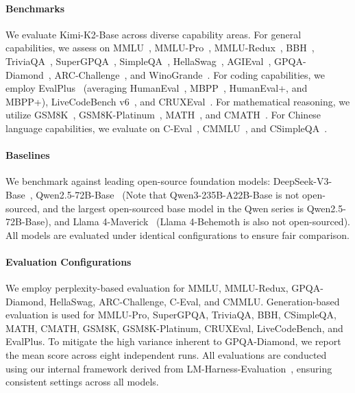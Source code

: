\paragraph{Benchmarks}
We evaluate Kimi-K2-Base across diverse capability areas.
For general capabilities, we assess on MMLU~\citep{hendrycks2021measuringmassivemultitasklanguage}, MMLU-Pro~\citep{wang2024mmluprorobustchallengingmultitask}, MMLU-Redux~\citep{gema2024we}, BBH~\citep{suzgun2022challengingbigbenchtaskschainofthought}, TriviaQA~\citep{joshi2017triviaqalargescaledistantly}, SuperGPQA~\citep{du2025supergpqa}, SimpleQA~\citep{wei2024measuring}, HellaSwag~\citep{zellers2019hellaswag}, AGIEval~\citep{zhong2023agieval}, GPQA-Diamond~\citep{rein2024gpqa}, ARC-Challenge~\citep{clark2018think}, and WinoGrande~\citep{sakaguchi2021winogrande}.
For coding capabilities, we employ EvalPlus~\citep{liu2023your} (averaging HumanEval~\citep{chen2021codex}, MBPP~\citep{austin2021programsynthesislargelanguage}, HumanEval+, and MBPP+), LiveCodeBench v6~\citep{jain2024livecodebench}, and CRUXEval~\citep{gu2024cruxeval}.
For mathematical reasoning, we utilize GSM8K~\citep{cobbe2021trainingverifierssolvemath}, GSM8K-Platinum~\citep{vendrow2025large}, MATH~\citep{hendrycks2021measuringmathematicalproblemsolving}, and CMATH~\citep{wei2023cmathlanguagemodelpass}.
For Chinese language capabilities, we evaluate on C-Eval~\citep{huang2023cevalmultilevelmultidisciplinechinese}, CMMLU~\citep{li2024cmmlumeasuringmassivemultitask}, and CSimpleQA~\citep{he2411chinese}.



\paragraph{Baselines}
We benchmark against leading open-source foundation models: DeepSeek-V3-Base~\citep{deepseekai2024deepseekv3technicalreport}, Qwen2.5-72B-Base~\citep{qwen2025qwen25technicalreport} (Note that Qwen3-235B-A22B-Base is not open-sourced, and the largest open-sourced base model in the Qwen series is Qwen2.5-72B-Base), and Llama 4-Maverick~\citep{metaLlamaHerd} (Llama 4-Behemoth is also not open-sourced). All models are evaluated under identical configurations to ensure fair comparison.


\paragraph{Evaluation Configurations}

We employ perplexity-based evaluation for MMLU, MMLU-Redux, GPQA-Diamond, HellaSwag, ARC-Challenge, C-Eval, and CMMLU. Generation-based evaluation is used for MMLU-Pro, SuperGPQA, TriviaQA, BBH, CSimpleQA, MATH, CMATH, GSM8K, GSM8K-Platinum, CRUXEval, LiveCodeBench, and EvalPlus. To mitigate the high variance inherent to GPQA-Diamond, we report the mean score across eight independent runs. All evaluations are conducted using our internal framework derived from LM-Harness-Evaluation~\citep{biderman2024lessons}, ensuring consistent settings across all models.


